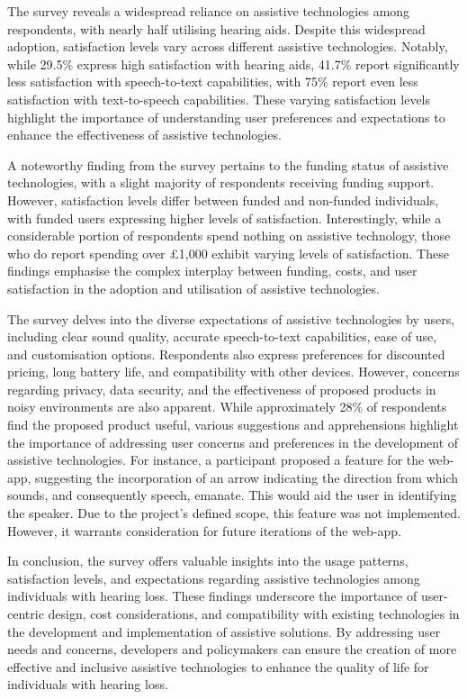 \documentclass{l4proj}
\begin{document}
The survey reveals a widespread reliance on assistive technologies among respondents, with nearly half utilising hearing aids. Despite this widespread adoption, satisfaction levels vary across different assistive technologies. Notably, while 29.5\% express high satisfaction with hearing aids, 41.7\% report significantly less satisfaction with speech-to-text capabilities, with 75\% report even less satisfaction with text-to-speech capabilities. These varying satisfaction levels highlight the importance of understanding user preferences and expectations to enhance the effectiveness of assistive technologies.

A noteworthy finding from the survey pertains to the funding status of assistive technologies, with a slight majority of respondents receiving funding support. However, satisfaction levels differ between funded and non-funded individuals, with funded users expressing higher levels of satisfaction. Interestingly, while a considerable portion of respondents spend nothing on assistive technology, those who do report spending over £1,000 exhibit varying levels of satisfaction. These findings emphasise the complex interplay between funding, costs, and user satisfaction in the adoption and utilisation of assistive technologies.

The survey delves into the diverse expectations of assistive technologies by users, including clear sound quality, accurate speech-to-text capabilities, ease of use, and customisation options. Respondents also express preferences for discounted pricing, long battery life, and compatibility with other devices. However, concerns regarding privacy, data security, and the effectiveness of proposed products in noisy environments are also apparent. While approximately 28\% of respondents find the proposed product useful, various suggestions and apprehensions highlight the importance of addressing user concerns and preferences in the development of assistive technologies. For instance, a participant proposed a feature for the web-app, suggesting the incorporation of an arrow indicating the direction from which sounds, and consequently speech, emanate. This would aid the user in identifying the speaker. Due to the project's defined scope, this feature was not implemented. However, it warrants consideration for future iterations of the web-app.

In conclusion, the survey offers valuable insights into the usage patterns, satisfaction levels, and expectations regarding assistive technologies among individuals with hearing loss. These findings underscore the importance of user-centric design, cost considerations, and compatibility with existing technologies in the development and implementation of assistive solutions. By addressing user needs and concerns, developers and policymakers can ensure the creation of more effective and inclusive assistive technologies to enhance the quality of life for individuals with hearing loss.
\end{document}
